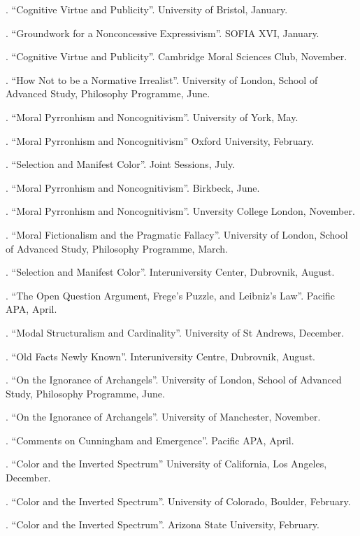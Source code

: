 \documentclass[11pt]{article}
\begin{document}
. ``Cognitive Virtue and Publicity''. University of Bristol, January.

.  ``Groundwork for a Nonconcessive Expressivism''. SOFIA XVI, January.

. ``Cognitive Virtue and Publicity''. Cambridge Moral Sciences Club, November.

. ``How Not to be a Normative Irrealist''. University of London, School of Advanced Study, Philosophy Programme, June.

. ``Moral Pyrronhism and Noncognitivism''. University of York, May.

. ``Moral Pyrronhism and Noncognitivism'' Oxford University, February.

. ``Selection and Manifest Color''. Joint Sessions, July.

. ``Moral Pyrronhism and Noncognitivism''. Birkbeck, June.

. ``Moral Pyrronhism and Noncognitivism''. Unversity College London, November.

. ``Moral Fictionalism and the Pragmatic Fallacy''. University of London, School of Advanced Study, Philosophy Programme, March.

. ``Selection and Manifest Color''. Interuniversity Center, Dubrovnik, August.

. ``The Open Question Argument, Frege's Puzzle, and Leibniz's Law''. Pacific APA, April.

. ``Modal Structuralism and Cardinality''.  University of St Andrews, December.

. ``Old Facts Newly Known''. Interuniversity Centre, Dubrovnik, August.

. ``On the Ignorance of Archangels''. University of London, School of Advanced Study, Philosophy Programme, June.

. ``On the Ignorance of Archangels''. University of Manchester, November.

. ``Comments on Cunningham and Emergence''. Pacific APA, April.

. ``Color and the Inverted Spectrum'' University of California, Los Angeles, December.

. ``Color and the Inverted Spectrum''. University of Colorado, Boulder, February.

. ``Color and the Inverted Spectrum''. Arizona State University, February.
\end{document}
